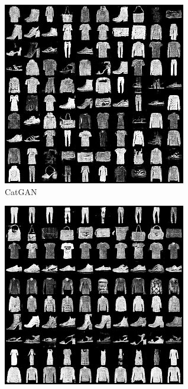 \begin{figure}[hbtp]
  \centering
  \begin{subfigure}[b]{\trif\textwidth}
    \includegraphics[width=\textwidth]{Img/fa-cg-new.png}
    \caption{CatGAN}
  \end{subfigure}
  \begin{subfigure}[b]{\trif\textwidth}
    \includegraphics[width=\textwidth]{Img/fa-icg-new.png}

\end{subfigure}
\end{figure}
